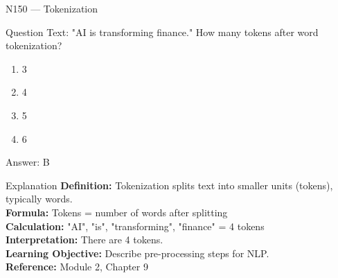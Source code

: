 \documentclass[aspectratio=169,8pt]{beamer}
\begin{document}
	\begin{frame}{N150 --- Tokenization}
		\begin{block}{Question}
			Text: "AI is transforming finance." How many tokens after word tokenization?
			\begin{enumerate}
				\item 3
				\item 4
				\item 5
				\item 6
			\end{enumerate}
		\end{block}
		\begin{exampleblock}{Answer: B}\end{exampleblock}
		\begin{block}{Explanation}
			\textbf{Definition:} Tokenization splits text into smaller units (tokens), typically words.\\
			\textbf{Formula:} Tokens = number of words after splitting\\
			\textbf{Calculation:} "AI", "is", "transforming", "finance" = 4 tokens\\
			\textbf{Interpretation:} There are 4 tokens.\\
			\textbf{Learning Objective:} Describe pre-processing steps for NLP.\\
			\textbf{Reference:} Module 2, Chapter 9
		\end{block}
	\end{frame}
	
\end{document}
